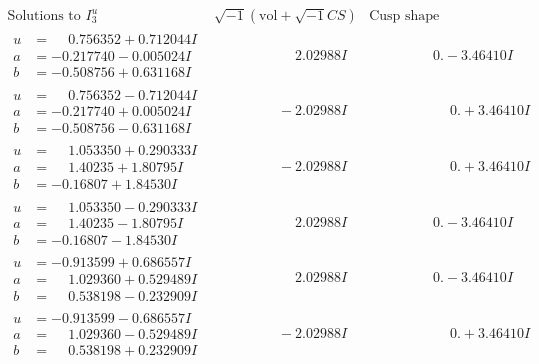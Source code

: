 \documentclass[1p]{elsarticle_modified}
\theoremstyle{definition}
\newcommand{\I}{\sqrt{-1}}
\begin{document}
$$\begin{array}{c|c|c}  
\text{Solutions to }I^u_{3}& \I (\text{vol} + \sqrt{-1}CS) & \text{Cusp shape}\\
 \hline 
\begin{aligned}
u &= \phantom{-}0.756352 + 0.712044 I \\
a &= -0.217740 - 0.005024 I \\
b &= -0.508756 + 0.631168 I\end{aligned}
 & \phantom{-0.000000 -}2.02988 I & \phantom{-0.000000 } 0. - 3.46410 I \\ \hline\begin{aligned}
u &= \phantom{-}0.756352 - 0.712044 I \\
a &= -0.217740 + 0.005024 I \\
b &= -0.508756 - 0.631168 I\end{aligned}
 & \phantom{-0.000000 } -2.02988 I & \phantom{-0.000000 -}0. + 3.46410 I \\ \hline\begin{aligned}
u &= \phantom{-}1.053350 + 0.290333 I \\
a &= \phantom{-}1.40235 + 1.80795 I \\
b &= -0.16807 + 1.84530 I\end{aligned}
 & \phantom{-0.000000 } -2.02988 I & \phantom{-0.000000 -}0. + 3.46410 I \\ \hline\begin{aligned}
u &= \phantom{-}1.053350 - 0.290333 I \\
a &= \phantom{-}1.40235 - 1.80795 I \\
b &= -0.16807 - 1.84530 I\end{aligned}
 & \phantom{-0.000000 -}2.02988 I & \phantom{-0.000000 } 0. - 3.46410 I \\ \hline\begin{aligned}
u &= -0.913599 + 0.686557 I \\
a &= \phantom{-}1.029360 + 0.529489 I \\
b &= \phantom{-}0.538198 - 0.232909 I\end{aligned}
 & \phantom{-0.000000 -}2.02988 I & \phantom{-0.000000 } 0. - 3.46410 I \\ \hline\begin{aligned}
u &= -0.913599 - 0.686557 I \\
a &= \phantom{-}1.029360 - 0.529489 I \\
b &= \phantom{-}0.538198 + 0.232909 I\end{aligned}
 & \phantom{-0.000000 } -2.02988 I & \phantom{-0.000000 -}0. + 3.46410 I \\ \hline\begin{aligned}

\end{aligned}
\end{array}$$
\end{document}
